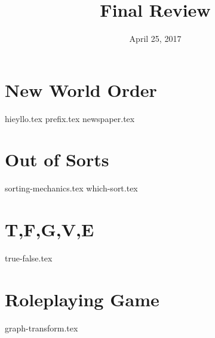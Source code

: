 \documentclass[11pt]{exam}
\title{Final Review}
\date{April 25, 2017}
\begin{document}
\maketitle

\section{New World Order}
\begin{questions}
{hieyllo.tex}
{prefix.tex}
{newspaper.tex}
\end{questions}

\pagebreak

\section{Out of Sorts}
\begin{questions}
{sorting-mechanics.tex}
{which-sort.tex}
\end{questions}

\pagebreak

\section{T,F,G,V,E}
\begin{questions}
{true-false.tex}
\end{questions}

\pagebreak

\section{Roleplaying Game}
\begin{questions}
{graph-transform.tex}
\end{questions}
\end{document}
